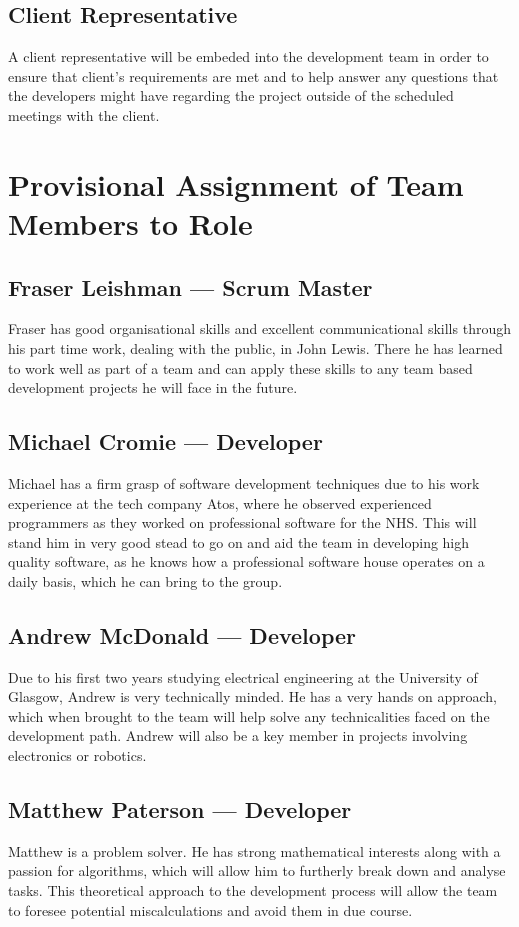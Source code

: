 \documentclass{article}
\begin{document}
\subsection{Client Representative}
A client representative will be embeded into the development team in order to 
ensure that client's requirements are met and to help answer any questions that 
the developers might have regarding the project outside of the scheduled meetings
with the client.

\section{Provisional Assignment of Team Members to Role}
\subsection{Fraser Leishman --- Scrum Master}
Fraser has good organisational skills and excellent communicational skills
through his part time work, dealing with the public, in John Lewis. There he
has learned to work well as part of a team and can apply these skills to any
team based development projects he will face in the future.

\subsection{Michael Cromie --- Developer}
Michael has a firm grasp of software development techniques due to his work
experience at the tech company Atos, where he observed experienced programmers
as they worked on professional software for the NHS. This will stand him in
very good stead to go on and aid the team in developing high quality software,
as he knows how a professional software house operates on a daily basis, which
he can bring to the group.

\subsection{Andrew McDonald --- Developer}
Due to his first two years studying electrical engineering at the University of
Glasgow, Andrew is very technically minded. He has a very hands on approach,
which when brought to the team will help solve any technicalities faced on the
development path. Andrew will also be a key member in projects involving
electronics or robotics.

\subsection{Matthew Paterson --- Developer}
Matthew is a problem solver. He has strong mathematical interests along with a
passion for algorithms, which will allow him to furtherly break down and
analyse tasks. This theoretical approach to the development process will allow
the team to foresee potential miscalculations and avoid them in due course. 
\end{document}
